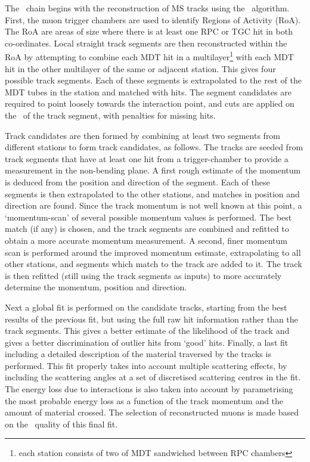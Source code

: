 The \staco\ chain begins with the reconstruction of MS tracks using the \muonboy\
algorithm. First, the muon trigger chambers are used to identify Regions of
Activity (RoA). The RoA are areas of size \deltaetadeltaphi{0.4}{0.4} where
there is at least one RPC or TGC hit in both co-ordinates. Local straight track
segments are then reconstructed within the RoA by attempting to combine each MDT
hit in a multilayer\footnote{each station consists of two \intro{multilayers} of MDT sandwiched
between RPC chambers} with each MDT hit in the other multilayer of the same or
adjacent station. This gives four possible track segments. Each of these segments
is extrapolated to the rest of the MDT tubes in the station and matched with hits. 
The segment candidates are required to point loosely towards the
interaction point, and cuts are applied on the \chisquared\ of the track
segment, with penalties for missing hits. 

Track candidates are then formed by combining at least two segments from
different stations to form track candidates, as follows. The tracks are seeded from track
segments that have at least one hit from a trigger-chamber to provide a
measurement in the non-bending plane. A first rough estimate of
the momentum is deduced from the position and direction of the segment. Each of
these segments is then extrapolated to the other stations, and matches in
position and direction are found. Since the track momentum is not well known at
this point, a `momentum-scan' of several possible momentum values is performed.
The best match (if any) is chosen, and the track segments are combined and
refitted to obtain a more accurate momentum measurement. A second, finer
momentum scan is performed around the improved momentum estimate, extrapolating
to all other stations, and segments which match to the track are added to it.
The track is then refitted (still using the track segments as inputs) to more
accurately determine the momentum, position and direction. 

Next a global fit is performed on the candidate tracks, starting from the best
results of the previous fit, but using the full raw hit information rather than
the track segments. This gives a better estimate of the likelihood of the track
and gives a better discrimination of outlier hits from `good' hits. Finally, a
last fit including a detailed description of the material traversed by the
tracks is performed.  This fit properly takes into account multiple scattering
effects, by including the scattering angles at a set of discretised scattering
centres in the fit. The energy loss due to interactions is also taken into
account  by parametrising the most probable energy loss as a function of the
track momentum and the amount of material crossed. The selection of
reconstructed muons is made based on the \chisquared\ quality of this final fit.

